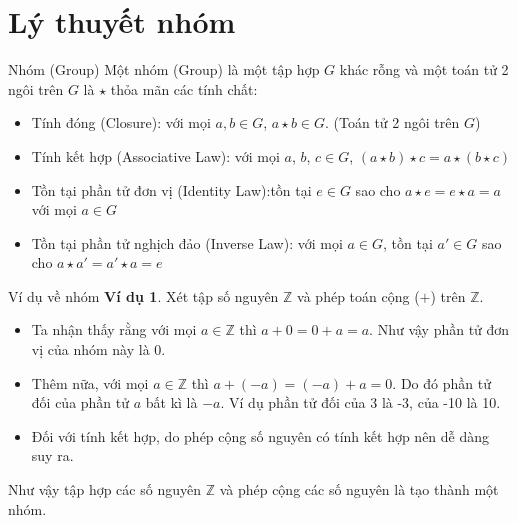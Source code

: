 \section{Lý thuyết nhóm}

\begin{frame}{Nhóm (Group)}
    Một nhóm (Group) là một tập hợp $G$ khác rỗng và một toán tử 2 ngôi trên $G$ là $\star$ thỏa mãn các tính chất:
    \begin{itemize}
        \item Tính đóng (Closure): với mọi $a, b \in G$, $a \star b \in G$. (Toán tử 2 ngôi trên $G$)
        \item Tính kết hợp (Associative Law): với mọi $a$, $b$, $c \in G$, $(a \star b) \star c = a \star (b \star c)$
        \item Tồn tại phần tử đơn vị (Identity Law):tồn tại  $e \in G$ sao cho $a \star e = e \star a = a$ với mọi $a \in G$
        \item Tồn tại phần tử nghịch đảo (Inverse Law): với mọi $a \in G$, tồn tại $a' \in G$ sao cho $a \star a' = a' \star a = e$
    \end{itemize}
\end{frame}

\begin{frame}{Ví dụ về nhóm}
    \textbf{Ví dụ 1}. Xét tập số nguyên $\mathbb{Z}$ và phép toán cộng ($+$) trên $\mathbb{Z}$.
    
    \begin{itemize}
        \item Ta nhận thấy rằng với mọi $a \in \mathbb{Z}$ thì $a + 0 = 0 + a = a$. Như vậy phần tử đơn vị của nhóm này là $0$.
        \item Thêm nữa, với mọi $a \in \mathbb{Z}$ thì $a + (-a) = (-a) + a = 0$. Do đó phần tử đối của phần tử $a$ bất kì là $-a$. Ví dụ phần tử đối của 3 là -3, của -10 là 10.
        \item Đối với tính kết hợp, do phép cộng số nguyên có tính kết hợp nên dễ dàng suy ra.
    \end{itemize}

    Như vậy tập hợp các số nguyên $\mathbb{Z}$ và phép cộng các số nguyên là tạo thành một nhóm.
\end{frame}

